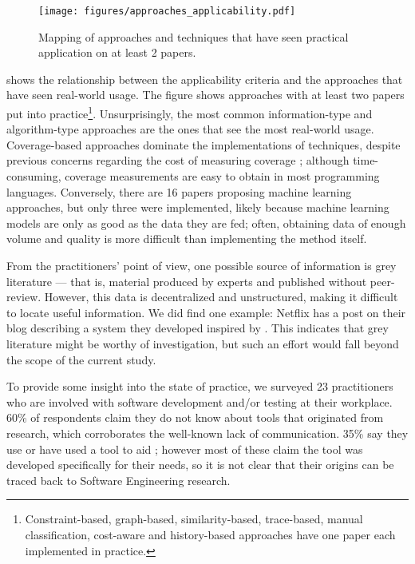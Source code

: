 \begin{figure}
  \center
  \texttt{[image: figures/approaches\_applicability.pdf]}
  \caption{Mapping of approaches and techniques that have seen practical application on at least 2 papers.}
  \label{fig:approaches_applicability}
\end{figure}

 shows the relationship between the applicability criteria and the approaches that have seen real-world usage.
The figure shows approaches with at least two papers put into practice\footnote{Constraint-based, graph-based, similarity-based, trace-based, manual classification, cost-aware and history-based approaches have one paper each implemented in practice.}.
Unsurprisingly, the most common information-type and algorithm-type approaches are the ones that see the most real-world usage.
Coverage-based approaches dominate the implementations of techniques, despite previous concerns regarding the cost of measuring coverage \cite{herzigkeynote}; although time-consuming, coverage measurements are easy to obtain in most programming languages.
Conversely, there are 16 papers proposing machine learning approaches, but only three were implemented, likely because machine learning models are only as good as the data they are fed; often, obtaining data of enough volume and quality is more difficult than implementing the method itself.

From the practitioners' point of view, one possible source of information is grey literature --- that is, material produced by experts and published without peer-review.
However, this data is decentralized and unstructured, making it difficult to locate useful information.
We did find one example: Netflix has a post on their blog \cite{netflixlerner} describing a system they developed inspired by .
This indicates that grey literature might be worthy of investigation, but such an effort would fall beyond the scope of the current study.

To provide some insight into the state of practice, we surveyed 23 practitioners who are involved with software development and/or testing at their workplace.
60\% of respondents claim they do not know about \rt tools that originated from research, which corroborates the well-known lack of communication.
35\% say they use or have used a tool to aid \rt; however most of these claim the tool was developed specifically for their needs, so it is not clear that their origins can be traced back to Software Engineering research.


